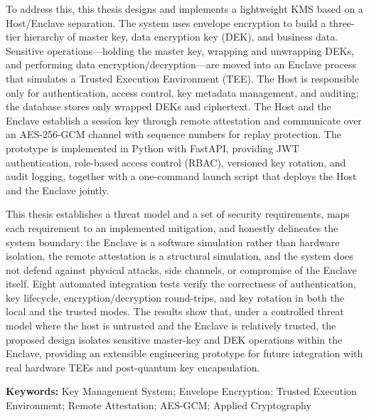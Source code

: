 To address this, this thesis designs and implements a lightweight KMS based on a Host/Enclave separation. The system uses envelope encryption to build a three-tier hierarchy of master key, data encryption key (DEK), and business data. Sensitive operations---holding the master key, wrapping and unwrapping DEKs, and performing data encryption/decryption---are moved into an Enclave process that simulates a Trusted Execution Environment (TEE). The Host is responsible only for authentication, access control, key metadata management, and auditing; the database stores only wrapped DEKs and ciphertext. The Host and the Enclave establish a session key through remote attestation and communicate over an AES-256-GCM channel with sequence numbers for replay protection. The prototype is implemented in Python with FastAPI, providing JWT authentication, role-based access control (RBAC), versioned key rotation, and audit logging, together with a one-command launch script that deploys the Host and the Enclave jointly.

This thesis establishes a threat model and a set of security requirements, maps each requirement to an implemented mitigation, and honestly delineates the system boundary: the Enclave is a software simulation rather than hardware isolation, the remote attestation is a structural simulation, and the system does not defend against physical attacks, side channels, or compromise of the Enclave itself. Eight automated integration tests verify the correctness of authentication, key lifecycle, encryption/decryption round-trips, and key rotation in both the local and the trusted modes. The results show that, under a controlled threat model where the host is untrusted and the Enclave is relatively trusted, the proposed design isolates sensitive master-key and DEK operations within the Enclave, providing an extensible engineering prototype for future integration with real hardware TEEs and post-quantum key encapsulation.

\vspace{1em}
\noindent\textbf{Keywords:} Key Management System; Envelope Encryption; Trusted Execution Environment; Remote Attestation; AES-GCM; Applied Cryptography
